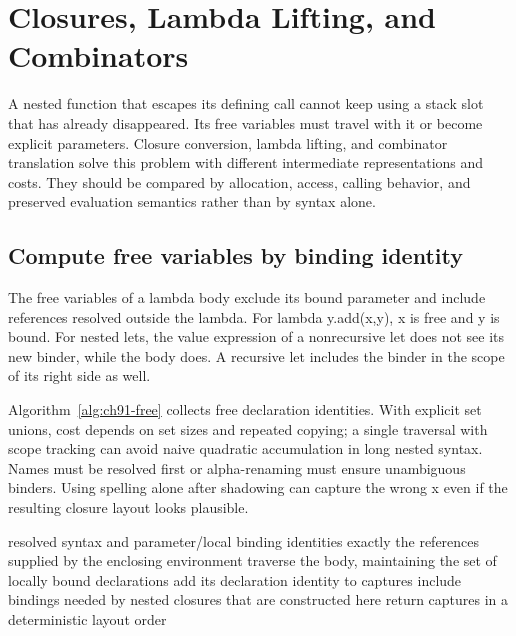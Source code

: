 \chapter{Closures, Lambda Lifting, and Combinators}
\label{ch:closures-lifting-combinators}

A nested function that escapes its defining call cannot keep using a stack slot that has already disappeared.
Its free variables must travel with it or become explicit parameters.
Closure conversion, lambda lifting, and combinator translation solve this problem with different intermediate representations and costs.
They should be compared by allocation, access, calling behavior, and preserved evaluation semantics rather than by syntax alone.

\section{Compute free variables by binding identity}
\label{sec:ch91-free}
The free variables of a lambda body exclude its bound parameter and include references resolved outside the lambda.
For lambda y.add(x,y), x is free and y is bound.
For nested lets, the value expression of a nonrecursive let does not see its new binder, while the body does.
A recursive let includes the binder in the scope of its right side as well.

Algorithm~\ref{alg:ch91-free} collects free declaration identities.
With explicit set unions, cost depends on set sizes and repeated copying; a single traversal with scope tracking can avoid naive quadratic accumulation in long nested syntax.
Names must be resolved first or alpha-renaming must ensure unambiguous binders.
Using spelling alone after shadowing can capture the wrong x even if the resulting closure layout looks plausible.

\begin{algorithm}[htbp]
\caption{Collect the free declaration identities needed by a closure.}
\label{alg:ch91-free}
\begin{pseudocode}
\Require resolved syntax and parameter/local binding identities
\Ensure exactly the references supplied by the enclosing environment
\State traverse the body, maintaining the set of locally bound declarations
 \State add its declaration identity to captures \EndIf
\EndFor
\State include bindings needed by nested closures that are constructed here
\State return captures in a deterministic layout order
\end{pseudocode}
\end{algorithm}

